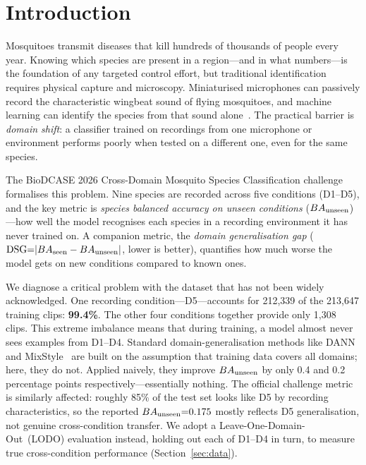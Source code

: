\section{Introduction}
\label{sec:intro}

Mosquitoes transmit diseases that kill hundreds of thousands of people
every year.
Knowing which species are present in a region---and in what numbers---is
the foundation of any targeted control effort, but traditional
identification requires physical capture and microscopy.
Miniaturised microphones can passively record the characteristic
wingbeat sound of flying mosquitoes, and machine learning can identify
the species from that sound alone~\cite{mukundarajan2017,kiskin2020humming}.
The practical barrier is \emph{domain shift}: a classifier trained on
recordings from one microphone or environment performs poorly when
tested on a different one, even for the same species.

The BioDCASE 2026 Cross-Domain Mosquito Species Classification
challenge~\cite{biodcase2026} formalises this problem.
Nine species are recorded across five conditions (D1--D5), and the
key metric is \emph{species balanced accuracy on unseen conditions}
($BA_{\text{unseen}}$)---how well the model recognises each species in a recording
environment it has never trained on.
A companion metric, the \emph{domain generalisation gap}
($\mathrm{DSG}{=}|BA_{\text{seen}} - BA_{\text{unseen}}|$, lower is better), quantifies how much worse
the model gets on new conditions compared to known ones.

We diagnose a critical problem with the dataset that has not been
widely acknowledged.
One recording condition---D5---accounts for 212,339 of the 213,647
training clips: \textbf{99.4\%}.
The other four conditions together provide only 1,308 clips.
This extreme imbalance means that during training, a model almost
never sees examples from D1--D4.
Standard domain-generalisation methods like DANN~\cite{dann2016} and
MixStyle~\cite{mixstyle2021} are built on the assumption that training
data covers all domains; here, they do not.
Applied naively, they improve $BA_{\text{unseen}}$ by only 0.4 and 0.2 percentage
points respectively---essentially nothing.
The official challenge metric is similarly affected: roughly 85\% of
the test set looks like D5 by recording characteristics, so the
reported $BA_{\text{unseen}}{=}0.175$ mostly reflects D5 generalisation, not
genuine cross-condition transfer.
We adopt a Leave-One-Domain-Out~(LODO) evaluation instead, holding
out each of D1--D4 in turn, to measure true cross-condition
performance (Section~\ref{sec:data}).

